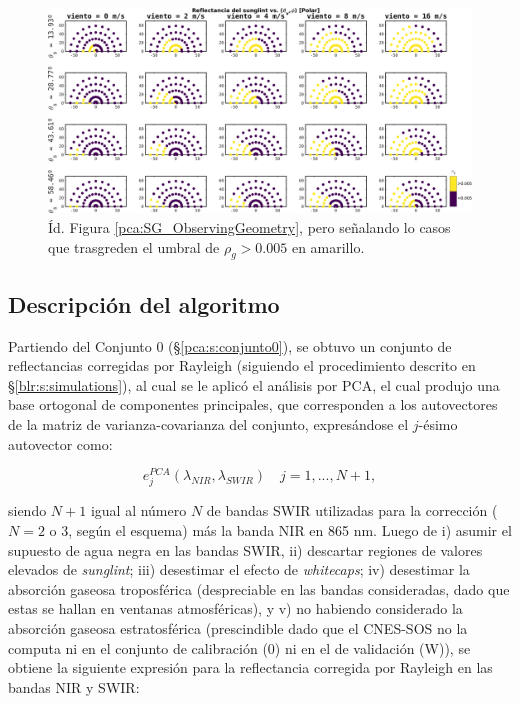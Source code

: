             \begin{figure}
            \centering
            \includegraphics[width=\textwidth]{pca/figures/SG_ObservingGeometryThresh.png}
            \caption[Reflectancia del \textit{sunglint} que trasgreden el umbral de 0.005.]{Íd. Figura \ref{pca:SG_ObservingGeometry}, pero señalando lo casos que trasgreden el umbral de $\rho_{g}>0.005$ en amarillo.}
            \label{pca:SG_ObservingGeometryThresh}
            \end{figure}

    \subsection{Descripción del algoritmo}
    \label{pca:s:algo}

        Partiendo del Conjunto 0 (\S \ref{pca:s:conjunto0}), se obtuvo un conjunto de reflectancias corregidas por Rayleigh (siguiendo el procedimiento descrito en \S \ref{blr:s:simulations}), al cual se le aplicó el análisis por PCA, el cual produjo una base ortogonal de componentes principales, que corresponden a los autovectores de la matriz de varianza-covarianza del conjunto, expresándose el $j$-ésimo autovector como:
        
        \begin{equation}
            e^{PCA}_{j}(\lambda_{NIR},\lambda_{SWIR}) \quad j=1,...,N+1, 
            \label{pca:eq:ejPCA}
        \end{equation}
        
        \noindent siendo $N+1$ igual al número $N$ de bandas SWIR utilizadas para la corrección ($N=2$ o $3$, según el esquema) más la banda NIR en 865 nm. Luego de i) asumir el supuesto de agua negra en las bandas SWIR, ii) descartar regiones de valores elevados de \textit{sunglint}; iii) desestimar el efecto de \textit{whitecaps}; iv) desestimar la absorción gaseosa troposférica (despreciable en las bandas consideradas, dado que estas se hallan en ventanas atmosféricas), y v) no habiendo considerado la absorción gaseosa estratosférica (prescindible dado que el CNES-SOS no la computa ni en el conjunto de calibración (0) ni en el de validación (W)), se obtiene la siguiente expresión para la reflectancia corregida por Rayleigh en las bandas NIR y SWIR:
        
